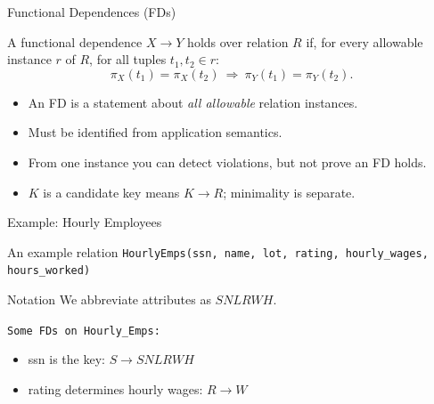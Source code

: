 \documentclass[10pt,aspectratio=169]{beamer}
\newenvironment{examplebox}[1][Example]{\begin{exampleblock}{#1}}{\end{exampleblock}}
\newcommand{\proj}{\pi}
\begin{document}
\begin{frame}{Functional Dependences (FDs)}
\begin{definition}
A functional dependence \(X \rightarrow Y\) holds over relation \(R\) if, for every allowable instance \(r\) of \(R\),
for all tuples \(t_1,t_2\in r\):
\[
\proj_X(t_1)=\proj_X(t_2)\ \Rightarrow\ \proj_Y(t_1)=\proj_Y(t_2).
\]
\end{definition}

\begin{itemize}
  \item An FD is a statement about \emph{all allowable} relation instances.
  \item Must be identified from application semantics.
  \item From one instance you can detect violations, but not prove an FD holds.
  \item \(K\) is a candidate key means \(K \rightarrow R\); minimality is separate.
\end{itemize}
\end{frame}

\begin{frame}{Example: Hourly Employees}
\begin{examplebox}[An example relation]
\texttt{HourlyEmps(ssn, name, lot, rating, hourly\_wages, hours\_worked)}
\end{examplebox}

\begin{block}{Notation}
We abbreviate attributes as \(\textit{SNLRWH}\).
\end{block}

\texttt{Some FDs on Hourly\_Emps:}
\begin{itemize}
  \item ssn is the key: \(S \rightarrow \textit{SNLRWH}\)
  \item rating determines hourly wages: \(R \rightarrow W\)
\end{itemize}
\end{frame}
\end{document}
